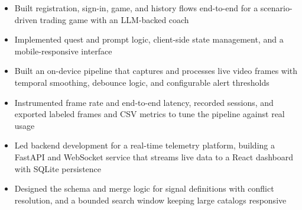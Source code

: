 \documentclass[10pt,letterpaper]{article}
\begin{document}

\begin{itemize}
  \item Built registration, sign-in, game, and history flows end-to-end for a scenario-driven trading game with an LLM-backed coach
  \item Implemented quest and prompt logic, client-side state management, and a mobile-responsive interface
\end{itemize}

\entryspace

\begin{itemize}
  \item Built an on-device pipeline that captures and processes live video frames with temporal smoothing, debounce logic, and configurable alert thresholds
  \item Instrumented frame rate and end-to-end latency, recorded sessions, and exported labeled frames and CSV metrics to tune the pipeline against real usage
\end{itemize}

\entryspace

\begin{itemize}
  \item Led backend development for a real-time telemetry platform, building a FastAPI and WebSocket service that streams live data to a React dashboard with SQLite persistence
  \item Designed the schema and merge logic for signal definitions with conflict resolution, and a bounded search window keeping large catalogs responsive
\end{itemize}
\end{document}

